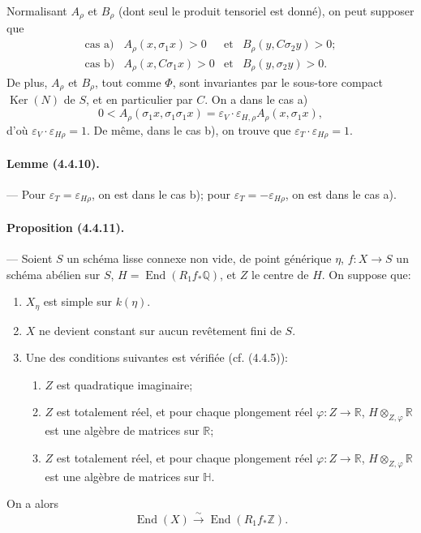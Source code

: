 \documentclass[10pt]{article}
\newcommand{\Q}{\mathbb Q}
\newcommand{\Z}{\mathbb Z}
\newcommand{\Ker}{\operatorname{Ker}}
\newcommand{\iso}{\xrightarrow{\sim}}
\newcommand{\R}{\mathbb R}
\providecommand{\End}{\operatorname{End}}
\begin{document}

Normalisant $A_\rho$ et $B_\rho$ (dont seul le produit tensoriel est donné), on peut supposer que
\[
\begin{array}{llll}
\text{cas a)}& A_\rho(x,\sigma_1x)>0 & \text{et} & B_\rho(y,C\sigma_2y)>0;\\[0.3em]
\text{cas b)}& A_\rho(x,C\sigma_1x)>0 & \text{et} & B_\rho(y,\sigma_2y)>0.
\end{array}
\]
De plus, $A_\rho$ et $B_\rho$, tout comme $\Phi$, sont invariantes par le sous-tore compact $\Ker(N)$ de $S$, et en particulier par $C$. On a dans le cas a)
\[
0<A_\rho(\sigma_1x,\sigma_1\sigma_1x)
=\varepsilon_V\cdot\varepsilon_{H,\rho} A_\rho(x,\sigma_1x),
\]
d'où $\varepsilon_V\cdot\varepsilon_{H\rho}=1$. De même, dans le cas b), on trouve que $\varepsilon_T\cdot\varepsilon_{H\rho}=1$.

\paragraph{Lemme (4.4.10).} --- Pour $\varepsilon_T=\varepsilon_{H\rho}$, on est dans le cas b); pour $\varepsilon_T=-\varepsilon_{H\rho}$, on est dans le cas a).

\paragraph{Proposition (4.4.11).} --- Soient $S$ un schéma lisse connexe non vide, de point générique $\eta$, $f:X\to S$ un schéma abélien sur $S$, $H=\End(R_1f_*\Q)$, et $Z$ le centre de $H$. On suppose que:
\begin{enumerate}[label=(\alph*)]
\item $X_\eta$ est simple sur $k(\eta)$.
\item $X$ ne devient constant sur aucun revêtement fini de $S$.
\item Une des conditions suivantes est vérifiée (cf. (4.4.5)):
\begin{enumerate}[label=(\ensuremath{c_{\arabic*}})]
\item $Z$ est quadratique imaginaire;
\item $Z$ est totalement réel, et pour chaque plongement réel $\varphi:Z\to\R$, $H\otimes_{Z,\varphi}\R$ est une algèbre de matrices sur $\R$;
\item $Z$ est totalement réel, et pour chaque plongement réel $\varphi:Z\to\R$, $H\otimes_{Z,\varphi}\R$ est une algèbre de matrices sur $\mathbb H$.
\end{enumerate}
\end{enumerate}
On a alors
\[
\End(X)\iso \End(R_1f_*\Z).
\]
\end{document}
